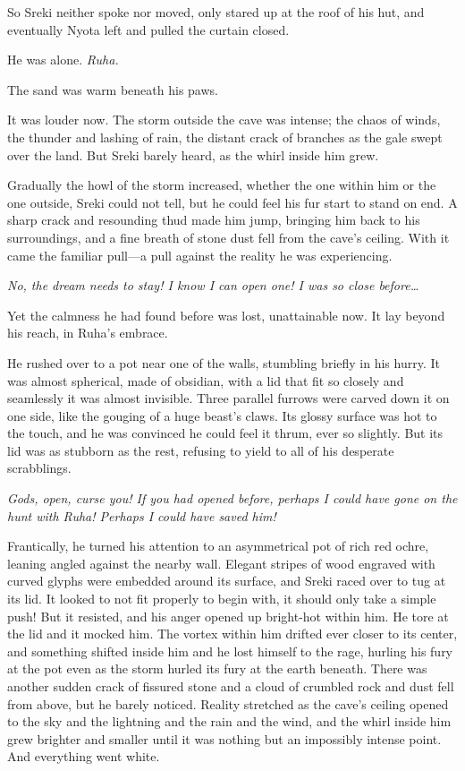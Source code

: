 So Sreki neither spoke nor moved, only stared up at the roof of his hut, and eventually Nyota left and pulled the curtain closed.

He was alone. \emph{Ruha.}

\secdiv

The sand was warm beneath his paws.

It was louder now. The storm outside the cave was intense; the chaos of winds, the thunder and lashing of rain, the distant crack of branches as the gale swept over the land. But Sreki barely heard, as the whirl inside him grew.

Gradually the howl of the storm increased, whether the one within him or the one outside, Sreki could not tell, but he could feel his fur start to stand on end. A sharp crack and resounding thud made him jump, bringing him back to his surroundings, and a fine breath of stone dust fell from the cave's ceiling. With it came the familiar pull---a pull against the reality he was experiencing.

\emph{No, the dream needs to stay! I know I can open one! I was so close before\ldots{}}

Yet the calmness he had found before was lost, unattainable now. It lay beyond his reach, in Ruha's embrace.

He rushed over to a pot near one of the walls, stumbling briefly in his hurry. It was almost spherical, made of obsidian, with a lid that fit so closely and seamlessly it was almost invisible. Three parallel furrows were carved down it on one side, like the gouging of a huge beast's claws. Its glossy surface was hot to the touch, and he was convinced he could feel it thrum, ever so slightly. But its lid was as stubborn as the rest, refusing to yield to all of his desperate scrabblings.

\emph{Gods, open, curse you! If you had opened before, perhaps I could have gone on the hunt with Ruha! Perhaps I could have saved him!}

Frantically, he turned his attention to an asymmetrical pot of rich red ochre, leaning angled against the nearby wall. Elegant stripes of wood engraved with curved glyphs were embedded around its surface, and Sreki raced over to tug at its lid. It looked to not fit properly to begin with, it should only take a simple push! But it resisted, and his anger opened up bright-hot within him. He tore at the lid and it mocked him. The vortex within him drifted ever closer to its center, and something shifted inside him and he lost himself to the rage, hurling his fury at the pot even as the storm hurled its fury at the earth beneath. There was another sudden crack of fissured stone and a cloud of crumbled rock and dust fell from above, but he barely noticed. Reality stretched as the cave's ceiling opened to the sky and the lightning and the rain and the wind, and the whirl inside him grew brighter and smaller until it was nothing but an impossibly intense point. And everything went white.

